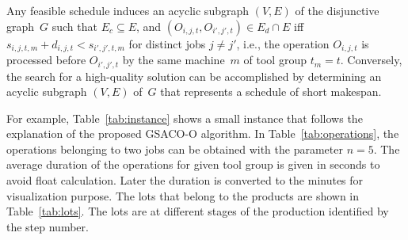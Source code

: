 Any feasible schedule induces an acyclic subgraph $(V,E)$ of 
the disjunctive graph~$G$
such that $E_c\subseteq E$, and $(O_{i,j,t},O_{i',j',t})\in E_d\cap E$
iff $s_{i,j,t,m}+d_{i,j,t} < s_{i',j',t,m}$ for distinct jobs $j\neq j'$,
i.e., the operation
$O_{i,j,t}$ is processed before $O_{i',j',t}$ by the same machine~$m$
of tool group $t_m=t$.
Conversely,
the search for a high-quality solution can be accomplished by
determining an acyclic subgraph $(V,E)$ of~$G$ that represents a schedule
of short makespan.

For example, Table~\ref{tab:instance} shows a small instance that follows the explanation of the proposed GSACO-O algorithm.
In Table~\ref{tab:operations}, the operations belonging to two jobs can
be obtained with the parameter $n=5$. The average duration of the operations for given tool group is given in seconds to avoid float calculation. Later the duration is converted to the minutes for visualization purpose.  
The lots that belong to the products are shown in Table~\ref{tab:lots}. The lots are at different stages of the production identified by the step number.


